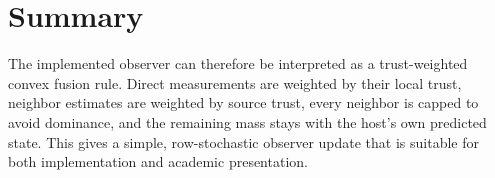 \documentclass[11pt]{article}
\begin{document}
\section{Summary}

The implemented observer can therefore be interpreted as a trust-weighted
convex fusion rule. Direct measurements are weighted by their local trust,
neighbor estimates are weighted by source trust, every neighbor is capped to
avoid dominance, and the remaining mass stays with the host's own predicted
state. This gives a simple, row-stochastic observer update that is suitable for
both implementation and academic presentation.
\end{document}
